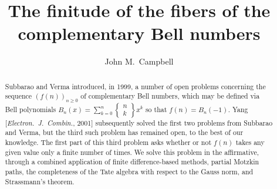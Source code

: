 \documentclass[11pt,letterpaper]{amsart}
\title[The fibers of the complementary Bell numbers]{The finitude of the fibers of the complementary Bell numbers}
\author{John M.\ Campbell}
\begin{document}
\begin{abstract}
 Subbarao and Verma introduced, in 1999, a number of open problems concerning the sequence $(f(n))_{n \geq 0}$ of 
 complementary Bell numbers, which may be defined via Bell polynomials $B_{n}(x) = \sum_{k=0}^{n} \left\{ \begin{smallmatrix} n \\ 
 k \end{smallmatrix} \right\} x^k$ so that $f(n) = B_{n}(-1)$. Yang [\emph{Electron.\ J.\ Combin.}, 2001] subsequently solved the first two 
 problems from Subbarao and Verma, but the third such problem has remained open, to the best of our knowledge. The first part of 
 this third problem asks whether or not $f(n)$ takes any given value only a finite number of times. We solve this problem in 
 the affirmative, through a combined application of finite difference-based methods, partial Motzkin paths, the completeness of the 
 Tate algebra with respect to the Gauss norm, and Strassmann’s theorem. 
 \end{abstract}

\maketitle
\end{document}
